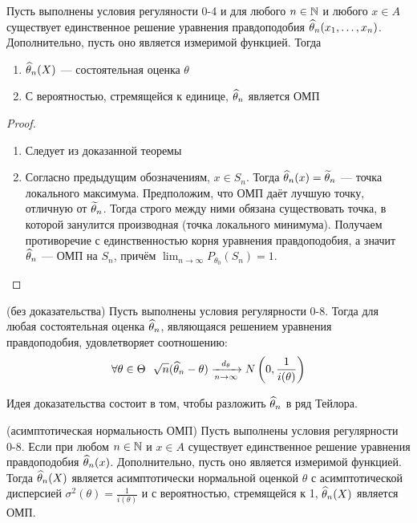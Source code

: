 \begin{corollary}
	Пусть выполнены условия регуляности 0-4 и для любого $n \in \mathbb{N}$ и любого $x \in A$ существует единственное решение уравнения правдоподобия $\widehat{\theta}_n(x_1, \ldots, x_n)$. Дополнительно, пусть оно является измеримой функцией. Тогда
	\begin{enumerate}
		\item $\widehat{\theta}_n(X)$ --- состоятельная оценка $\theta$
		
		\item С вероятностью, стремящейся к единице, $\widehat{\theta}_n$ является ОМП
	\end{enumerate}
\end{corollary}

\begin{proof}~
	\begin{enumerate}
		\item Следует из доказанной теоремы
		
		\item Согласно предыдущим обозначениям, $x \in S_n$. Тогда $\widehat{\theta}_n(x) = \widetilde{\theta}_n$ --- точка локального максимума. Предположим, что ОМП даёт лучшую точку, отличную от $\widetilde{\theta}_n$. Тогда строго между ними обязана существовать точка, в которой занулится производная (точка локального минимума). Получаем противоречие с единственностью корня уравнения правдоподобия, а значит $\widehat{\theta}_n$ --- ОМП на $S_n$, причём $\lim_{n \to \infty} P_{\theta_0}(S_n) = 1$.
	\end{enumerate}
\end{proof}

\begin{theorem} (без доказательства)
	Пусть выполнены условия регулярности 0-8. Тогда для любая состоятельная оценка $\widehat{\theta}_n$, являющаяся решением уравнения правдоподобия, удовлетворяет соотношению:
	\[
		\forall \theta \in \Theta\ \ \sqrt{n}(\wh{\theta}_n - \theta) \xrightarrow[n \to \infty]{d_\theta} N\ps{0, \frac{1}{i(\theta)}}
	\]
\end{theorem}

\begin{note}
	Идея доказательства состоит в том, чтобы разложить $\widehat{\theta}_n$ в ряд Тейлора.
\end{note}

\begin{corollary} (асимптотическая нормальность ОМП)
	Пусть выполнены условия регулярности 0-8. Если при любом $n \in \mathbb{N}$ и $x \in A$ существует единственное решение уравнения правдоподобия $\widehat{\theta}_n(x)$. Дополнительно, пусть оно является измеримой функцией. Тогда $\widehat{\theta}_n(X)$ является асимптотически нормальной оценкой $\theta$ с асимптотической дисперсией $\sigma^2(\theta) = \frac{1}{i(\theta)}$ и с вероятностью, стремящейся к 1, $\widehat{\theta}_n(X)$ является ОМП.
\end{corollary}

